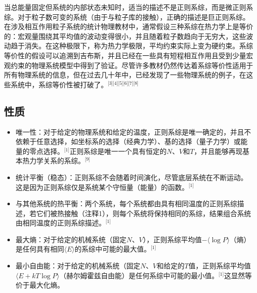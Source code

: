 当总能量固定但系统的内部状态未知时，适当的描述不是正则系综，而是微正则系综。对于粒子数可变的系统（由于与粒子库的接触），正确的描述是巨正则系综。在涉及相互作用粒子系统的统计物理教材中，通常假设三种系综在热力学上是等价的：宏观量围绕其平均值的波动变得很小，并且随着粒子数趋向于无穷大，这些波动趋于消失。在这种极限下，称为热力学极限，平均约束实际上变为硬约束。系综等价性的假设可以追溯到吉布斯，并且已经在一些具有短程相互作用且受到少量宏观约束的物理系统模型中得到了验证。尽管许多教材仍然传达着系综等价性适用于所有物理系统的信息，但在过去几十年中，已经发现了一些物理系统的例子，在这些系统中，系综等价性被打破了。\(^\text{[3][4][5][6][7][8]}\)
\subsection{性质}  
\begin{itemize}
\item 唯一性：对于给定的物理系统和给定的温度，正则系综是唯一确定的，并且不依赖于任意选择，如坐标系的选择（经典力学）、基的选择（量子力学）或能量的零点选择。\(^\text{[1]}\)正则系综是唯一一个具有恒定的\( N \)、\( V \)和\( T \)，并且能够再现基本热力学关系的系综。\(^\text{[9]}\)
\item 统计平衡（稳态）：正则系综不会随着时间演化，尽管底层系统在不断运动。这是因为正则系综仅是系统某个守恒量（能量）的函数。\(^\text{[1]}\)
\item 与其他系统的热平衡：两个系统，每个系统都由具有相同温度的正则系综描述，若它们被热接触（注释1），则每个系统将保持相同的系综，结果组合系统由相同温度的正则系综描述。\(^\text{[1]}\)
\item 最大熵：对于给定的机械系统（固定\( N \)、\( V \)），正则系综平均值\( -\langle \log P \rangle \)（熵）是任何具有相同\( \langle E \rangle \)的系综中可能的最大值。\(^\text{[1]}\)
\item 最小自由能：对于给定的机械系统（固定\( N \)、\( V \)和给定的\( T \)值，正则系综平均值\( \langle E + kT \log P \rangle \)（赫尔姆霍兹自由能）是任何系综中可能的最小值。\(^\text{[1]}\)这显然等价于最大化熵。
\end{itemize}
